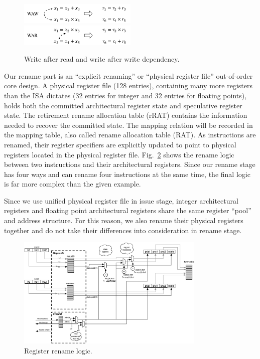 \begin{figure}[!htp]
    \centering
    \includegraphics[width=0.5\textwidth]{figure/waw.png}
    \includegraphics[width=0.5\textwidth]{figure/war.png}
    \caption{Write after read and write after write dependency.}
    \label{fig:waw_war}
\end{figure}

Our rename part is an ``explicit renaming'' or ``physical register file'' out-of-order core design. A physical register file (128 entries), containing many more registers than the ISA dictates (32 entries for integer and 32 entries for floating points), holds both the committed architectural register state and speculative register state. The retirement rename allocation table (rRAT) contains the information needed to recover the committed state. The mapping relation will be recorded in the mapping table, also called rename allocation table (RAT). As instructions are renamed, their register specifiers are explicitly updated to point to physical registers located in the physical register file. Fig.~\ref{fig:rename} shows the rename logic between two instructions and their architectural registers. Since our rename stage has four ways and can rename four instructions at the same time, the final logic is far more complex than the given example.

Since we use unified physical register file in issue stage, integer architectural registers and floating point architectural registers share the same register ``pool'' and address structure. For this reason, we also rename their physical registers together and do not take their differences into consideration in rename stage.

\begin{figure}[!htp]
    \centering
    \includegraphics[width=0.8\textwidth]{figure/rename-pipeline.png}
    \caption{Register rename logic\cite{Boom}.}
    \label{fig:rename}
\end{figure}

